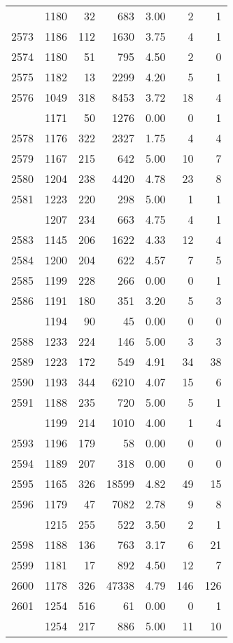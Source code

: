\documentclass[
]{article}
\begin{document}
\begin{table}
\begin{tabular}[t]{lrrrrrr}
\addlinespace
2572 & 1180 & 32 & 683 & 3.00 & 2 & 1\\
2573 & 1186 & 112 & 1630 & 3.75 & 4 & 1\\
2574 & 1180 & 51 & 795 & 4.50 & 2 & 0\\
2575 & 1182 & 13 & 2299 & 4.20 & 5 & 1\\
2576 & 1049 & 318 & 8453 & 3.72 & 18 & 4\\
\addlinespace
2577 & 1171 & 50 & 1276 & 0.00 & 0 & 1\\
2578 & 1176 & 322 & 2327 & 1.75 & 4 & 4\\
2579 & 1167 & 215 & 642 & 5.00 & 10 & 7\\
2580 & 1204 & 238 & 4420 & 4.78 & 23 & 8\\
2581 & 1223 & 220 & 298 & 5.00 & 1 & 1\\
\addlinespace
2582 & 1207 & 234 & 663 & 4.75 & 4 & 1\\
2583 & 1145 & 206 & 1622 & 4.33 & 12 & 4\\
2584 & 1200 & 204 & 622 & 4.57 & 7 & 5\\
2585 & 1199 & 228 & 266 & 0.00 & 0 & 1\\
2586 & 1191 & 180 & 351 & 3.20 & 5 & 3\\
\addlinespace
2587 & 1194 & 90 & 45 & 0.00 & 0 & 0\\
2588 & 1233 & 224 & 146 & 5.00 & 3 & 3\\
2589 & 1223 & 172 & 549 & 4.91 & 34 & 38\\
2590 & 1193 & 344 & 6210 & 4.07 & 15 & 6\\
2591 & 1188 & 235 & 720 & 5.00 & 5 & 1\\
\addlinespace
2592 & 1199 & 214 & 1010 & 4.00 & 1 & 4\\
2593 & 1196 & 179 & 58 & 0.00 & 0 & 0\\
2594 & 1189 & 207 & 318 & 0.00 & 0 & 0\\
2595 & 1165 & 326 & 18599 & 4.82 & 49 & 15\\
2596 & 1179 & 47 & 7082 & 2.78 & 9 & 8\\
\addlinespace
2597 & 1215 & 255 & 522 & 3.50 & 2 & 1\\
2598 & 1188 & 136 & 763 & 3.17 & 6 & 21\\
2599 & 1181 & 17 & 892 & 4.50 & 12 & 7\\
2600 & 1178 & 326 & 47338 & 4.79 & 146 & 126\\
2601 & 1254 & 516 & 61 & 0.00 & 0 & 1\\
\addlinespace
2602 & 1254 & 217 & 886 & 5.00 & 11 & 10\\

\end{tabular}
\end{table}
\end{document}
